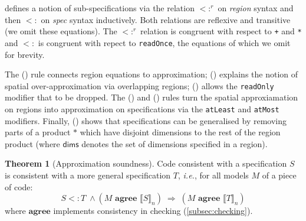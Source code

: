 \documentclass[10pt,preprint]{sigplanconf}
\newcounter{block}
\theoremstyle{definition}
\newtheorem{theorem}[block]{Theorem}
\newcommand{\ie}{\emph{i.e.}}
\newcommand{\interp}[1]{\llbracket{#1}\rrbracket}
\newcommand{\term}[1]{\texttt{#1}}
\newcommand{\trule}[1]{{\footnotesize{(\text{#1})}}}
\newcommand{\consAName}{\textbf{agree}}
\newcommand{\consA}[2]{#1 \,\, \consAName{} \,\, #2}
\begin{document}
 defines a notion of sub-specifications
via the relation $<:^r$ on \textit{region}
syntax and then $<:$ on \textit{spec} syntax inductively.
Both relations are reflexive and transitive (we omit
these equations). The $<:^r$ relation is congruent
with respect to \term{+} and \term{*} and $<:$ is congruent
with repect to \term{readOnce}, the equations of which we omit for brevity.

The \trule{\textsc{eq}} rule connects region
equations to approximation; \trule{\textsc{over}} explains
the notion of spatial over-approximation via overlapping regions;
\trule{\textsc{rep}} allows the \term{readOnly} modifier that
to be dropped. The \trule{\textsc{shrink}}
and \trule{\textsc{grow}} rules turn the spatial approxiamation on
regions into approximation on specifications via the \term{atLeast} and \term{atMost}
modifiers. Finally, \trule{\textsc{Gen$\ast$}} shows
that specifications can be generalised by removing parts of a product
$\ast$ which have disjoint dimensions to the rest of the region
product (where $\mathsf{dims}$ denotes the set of dimensions specified
in a region).

\begin{theorem}[Approximation soundness]
Code consistent with a specification $S$
 is consistent with a more general specification $T$,
\ie{}, for all models $M$ of a piece of code:
\begin{equation*}
S <: T \; \wedge (\consA{M}{\interp{S}_n}) \;
\Rightarrow \; (\consA{M}{\interp{T}_n})
\end{equation*}
where $\consAName$ implements consistency in checking (\cref{subsec:checking}).
\end{theorem}
\end{document}
